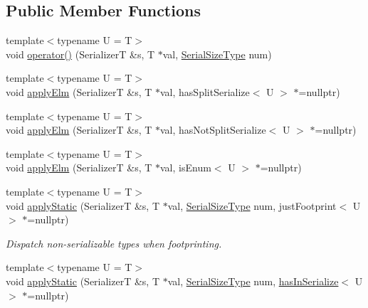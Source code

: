 \subsection*{Public Member Functions}
\begin{DoxyCompactItemize}
\item 
{\footnotesize template$<$typename U  = T$>$ }\\void \hyperlink{structcheckpoint_1_1dispatch_1_1_serializer_dispatch_non_byte_a6cf01feb8acb29ef56c37d3180b63671}{operator()} (SerializerT \&s, T $\ast$val, \hyperlink{namespacecheckpoint_a083f6674da3f94c2901b18c6d238217c}{Serial\+Size\+Type} num)
\item 
{\footnotesize template$<$typename U  = T$>$ }\\void \hyperlink{structcheckpoint_1_1dispatch_1_1_serializer_dispatch_non_byte_a3bbb12db16d00e1c76e51b52452187aa}{apply\+Elm} (SerializerT \&s, T $\ast$val, has\+Split\+Serialize$<$ U $>$ $\ast$=nullptr)
\item 
{\footnotesize template$<$typename U  = T$>$ }\\void \hyperlink{structcheckpoint_1_1dispatch_1_1_serializer_dispatch_non_byte_a88fe1c00864f170cd59deb25a2bf2695}{apply\+Elm} (SerializerT \&s, T $\ast$val, has\+Not\+Split\+Serialize$<$ U $>$ $\ast$=nullptr)
\item 
{\footnotesize template$<$typename U  = T$>$ }\\void \hyperlink{structcheckpoint_1_1dispatch_1_1_serializer_dispatch_non_byte_a7cd7decd9c65f3f5d68a2e593275f8d1}{apply\+Elm} (SerializerT \&s, T $\ast$val, is\+Enum$<$ U $>$ $\ast$=nullptr)
\item 
{\footnotesize template$<$typename U  = T$>$ }\\void \hyperlink{structcheckpoint_1_1dispatch_1_1_serializer_dispatch_non_byte_a38d952156a857c4eba994db912725590}{apply\+Static} (SerializerT \&s, T $\ast$val, \hyperlink{namespacecheckpoint_a083f6674da3f94c2901b18c6d238217c}{Serial\+Size\+Type} num, just\+Footprint$<$ U $>$ $\ast$=nullptr)
\begin{DoxyCompactList}\small\item\em Dispatch non-\/serializable types when footprinting. \end{DoxyCompactList}\item 
{\footnotesize template$<$typename U  = T$>$ }\\void \hyperlink{structcheckpoint_1_1dispatch_1_1_serializer_dispatch_non_byte_a5c76cadd528c3d2348a3963d44402aea}{apply\+Static} (SerializerT \&s, T $\ast$val, \hyperlink{namespacecheckpoint_a083f6674da3f94c2901b18c6d238217c}{Serial\+Size\+Type} num, \hyperlink{structcheckpoint_1_1dispatch_1_1_serializer_dispatch_non_byte_a7f2203710503e6ea7a5c4a565795a1d0}{has\+In\+Serialize}$<$ U $>$ $\ast$=nullptr)

\end{DoxyCompactItemize}
